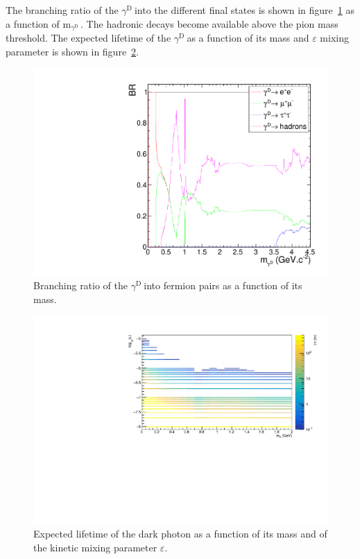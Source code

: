\documentclass[12pt,a4paper,]{article}
\newcommand{\mathDP}{\gamma^{\mathrm{D}}\ }
\newcommand{\DP}{$\mathDP$}
\newcommand{\mDP}{m$_{\mathDP}$}
\begin{document}
The branching ratio of the \DP into the different final states is
shown in figure~\ref{fig:decayBR} as a function of \mDP. The hadronic
decays become available above the pion mass threshold. The expected
lifetime of the \DP as a function of its mass and $\varepsilon$ mixing
parameter is shown in figure~\ref{fig:ctau}.


\begin{figure}[h!]
  \centering
\includegraphics[width=1.\textwidth]{figures/BRvsmass.pdf}
\caption{Branching ratio of the \DP into fermion pairs as a function
  of its mass.}
\label{fig:decayBR}
\end{figure}


\begin{figure}[h!]
  \centering
\includegraphics[width=1.\textwidth]{figures/ctauvsmassvseps.pdf}
\caption{Expected lifetime of the dark photon as a function of its mass and of the kinetic mixing parameter $\varepsilon$.}
\label{fig:ctau}
\end{figure}
\end{document}
